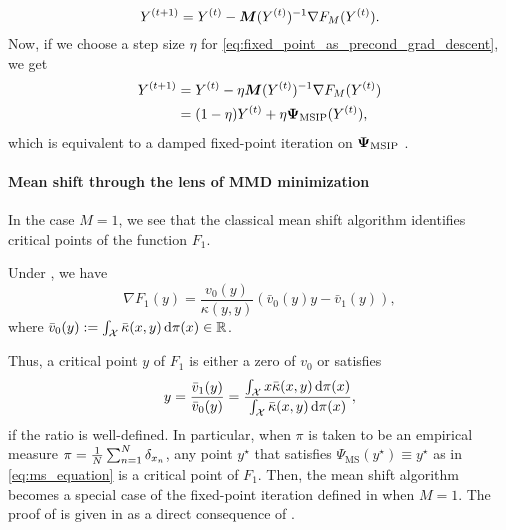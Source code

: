 \begin{equation}\label{eq:fixed_point_as_precond_grad_descent}
  Y^{(t+1)}   = Y^{(t)} - \bm{M}(Y^{(t)})^{-1} \nabla F_{M}(Y^{(t)}).
\end{equation}
Now, if we choose a step size $\eta$ for  \eqref{eq:fixed_point_as_precond_grad_descent}, we get 
\begin{equation}\label{eq:fixed_point_as_precond_grad_descent_alpha}
\begin{split}
  Y^{(t+1)} &= Y^{(t)} - \eta\bm{M}(Y^{(t)})^{-1} \nabla F_{M}(Y^{(t)})\\
  &= (1-\eta) Y^{(t)} + \eta \bm{\Psi}_{\mathrm{MSIP}}(Y^{(t)}),
  \end{split}
\end{equation}
which is equivalent to a damped fixed-point iteration on $\bm{\Psi}_{\mathrm{MSIP}}$ \cite{Ke18}. 

\paragraph{Mean shift through the lens of MMD minimization}
In the case $M = 1$, we see that the classical mean shift algorithm identifies critical points of the function $F_1$.
\begin{corollary}\label{cor:ms_as_MSIP} Under , we have
\begin{equation}\label{eq:gradient_F_1}
    \nabla F_{1}(y) = \frac{v_{0}(y)}{\kappa(y,y)} \left(\bar{v}_{0}(y) y - \bar{v}_{1}(y) \right),
\end{equation}
where $\bar{v}_{0}(y):= \int_{\mathcal{X}} \bar{\kappa}(x,y) \,\mathrm{d}\pi(x) \in \mathbb{R}$. 
\end{corollary}
Thus, a critical point $y$ of $F_1$ is either a zero of $v_{0}$ or satisfies
\begin{equation}\label{eq:goq_for_K_1}
      y = \frac{\bar{v}_{1}(y)}{\bar{v}_{0}(y)} = \frac{\int_{\mathcal{X}} x \bar{\kappa}(x, y)  \,\mathrm{d}\pi(x)}{\int_{\mathcal{X}} \bar{\kappa}(x, y) \,\mathrm{d}\pi(x)},
\end{equation}
if the ratio is well-defined. 
In particular, when $\pi$ is taken to be an empirical measure $\pi = \frac{1}{N} \sum_{n=1}^{N} \delta_{x_{n}}$,
any point $y^\star$ that satisfies $\Psi_{\mathrm{MS}}(y^\star)\equiv y^\star$ as in \eqref{eq:ms_equation} is a critical point of $F_{1}$. Then, the mean shift algorithm becomes a special case of the fixed-point iteration defined in  when $M = 1$. 
The proof of  is given in  as a direct consequence of .  

